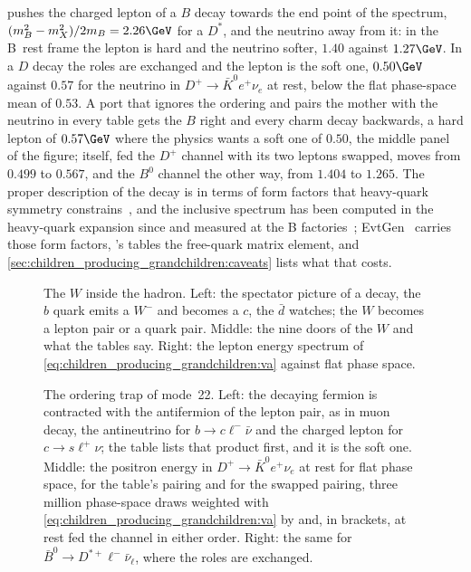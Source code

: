 pushes the charged lepton of a $B$ decay towards the end point of the
spectrum, $(m_B^2-m_X^2)/2m_B=2.26\GeV$ for a $D^*$, and the neutrino
away from it: in the B~rest frame the lepton is hard and the neutrino
softer, $1.40$ against $1.27\GeV$. In a $D$ decay the roles are exchanged
and the lepton is the soft one, $0.50\GeV$ against $0.57$ for the
neutrino in $D^+\to\bar K^0e^+\nu_e$ at rest, below the flat phase-space
mean of $0.53$. A port that ignores the ordering and pairs the mother
with the neutrino in every table gets the $B$ right and every charm decay
backwards, a hard lepton of $0.57\GeV$ where the physics wants a soft one
of $0.50$, the middle panel of the figure; \PYTHIA itself, fed the $D^+$
channel with its two leptons swapped, moves from $0.499$ to $0.567$, and
the $B^0$ channel the other way, from $1.404$ to $1.265$. The proper
description of the decay
is in terms of form factors that heavy-quark symmetry
constrains~\cite{Isgur:1989vq,Neubert:1993mb,Caprini:1997mu,Boyd:1995sq},
and the inclusive spectrum has been computed in the heavy-quark expansion
since \cite{Altarelli:1982kh,Manohar:1993qn} and measured at the B
factories~\cite{BaBar:2004bij}; EvtGen~\cite{Lange:2001uf} carries those
form factors, \PYTHIA's tables the free-quark matrix element, and
\cref{sec:children_producing_grandchildren:caveats} lists what that costs.

\begin{figure}[htbp]\centering
\resizebox{\textwidth}{!}{}
\caption[The spectator picture of $b\to cW$, the nine doors of the $W$ and
the lepton spectrum]{The $W$ inside the hadron. Left: the spectator
picture of a \Bbar decay, the $b$ quark emits a $W^-$ and becomes a $c$,
the $\bar d$ watches; the $W$ becomes a lepton pair or a quark pair.
Middle: the nine doors of the $W$ and what the tables say. Right: the
lepton energy spectrum of \cref{eq:children_producing_grandchildren:va}
against flat phase space.}
\label{fig:children_producing_grandchildren:feynman_sketch}
\end{figure}

\begin{figure}[htbp]\centering
\resizebox{\textwidth}{!}{}
\caption[The pairing rule of the V$-$A weight and the ordering trap]{The
ordering trap of mode~22. Left: the decaying fermion is contracted with
the antifermion of the lepton pair, as in muon decay, the antineutrino
for $b\to c\ell^-\bar\nu$ and the charged lepton for $c\to s\ell^+\nu$;
the table lists that product first, and it is the soft one. Middle: the
positron energy in $D^+\to\bar K^0e^+\nu_e$ at rest for flat phase space,
for the table's pairing and for the swapped pairing, three million
phase-space draws weighted with
\cref{eq:children_producing_grandchildren:va} by
 and, in brackets, \PYTHIA at rest fed the
channel in either order. Right: the same for
$\bar B^0\to D^{*+}\ell^-\bar\nu_\ell$, where the roles are exchanged.}
\label{fig:children_producing_grandchildren:ordering_sketch}
\end{figure}


